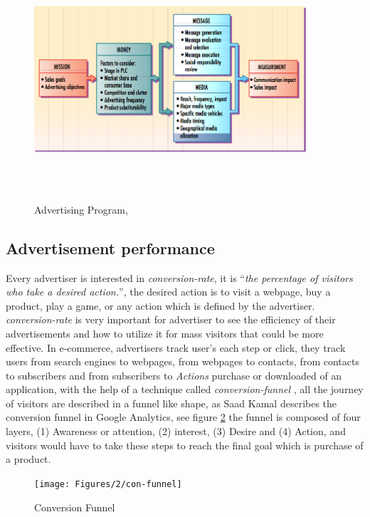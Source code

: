 \begin{figure}[H]
\centering
\includegraphics[width=0.9\textwidth,height=90mm]{Figures/2/adprogram}
\caption{Advertising Program, \cite{adprogram}}
\label{fig:adprograme}
\end{figure}


\subsection{Advertisement performance}

Every advertiser is interested in \emph{conversion-rate}, it is ``\emph{the percentage of visitors who take a desired action.}''\cite{convrate}, the desired action is to visit a webpage, buy a product, play a game, or any action which is defined by the advertiser. \emph{conversion-rate} is very important for advertiser to see the efficiency of their advertisements and how to utilize it for mass visitors that could be more effective. In e-commerce, advertisers track user’s each step or click, they track users from search engines to webpages, from webpages to contacts, from contacts to subscribers and from subscribers to \emph{Actions} purchase or downloaded of an application, with the help of a technique called \emph{conversion-funnel} \cite{convfunnel}, all the journey of visitors are described in a funnel like shape, as Saad Kamal \cite{googlefunnel} describes the conversion funnel in Google Analytics, see figure \ref{fig:conversion_funnel} the funnel is composed of four layers, (1) Awareness or attention, (2) interest, (3) Desire and (4) Action, and visitors would have to take these steps to reach the final goal which is purchase of a product. 

\begin{figure}[H]
\centering
\texttt{[image: Figures/2/con-funnel]}
\caption{Conversion Funnel}
\label{fig:conversion_funnel}
\end{figure}

